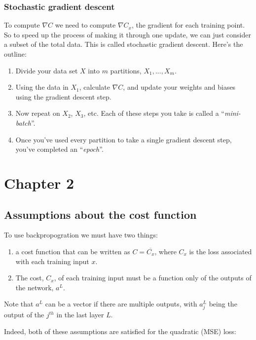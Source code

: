 \documentclass[12pt]{article}
\begin{document}
\subsubsection*{Stochastic gradient descent}

To compute $\nabla C$ we need to compute $\nabla C_x$, the gradient for each training point. So to speed up the process of making it through one update, we can just consider a subset of the total data. This is called stochastic gradient descent. Here's the outline:

\begin{enumerate}
\item Divide your data set $X$ into $m$ partitions, $X_1, ..., X_m$.
\item Using the data in $X_1$, calculate $\nabla C$, and update your weights and biases using the gradient descent step.
\item Now repeat on $X_2$, $X_3$, etc. Each of these steps you take is called a ``\textit{mini-batch}''.
\item Once you've used every partition to take a single gradient descent step, you've completed an ``\textit{epoch}''.
\end{enumerate}

\section*{Chapter 2}

\subsection*{Assumptions about the cost function}

To use backpropogration we must have two things:

\begin{enumerate}
\item a cost function that can be written as $C = \overline{C_x}$, where $C_x$ is the loss associated with each training input $x$.

\item The cost, $C_x$, of each training input must be a function only of the outputs of the network, $a^L$.
\end{enumerate}

Note that $a^L$ can be a vector if there are multiple outputs, with $a^L_j$ being the output of the $j^{th}$ in the last layer $L$.

Indeed, both of these assumptions are satisfied for the quadratic (MSE) loss:
\end{document}
